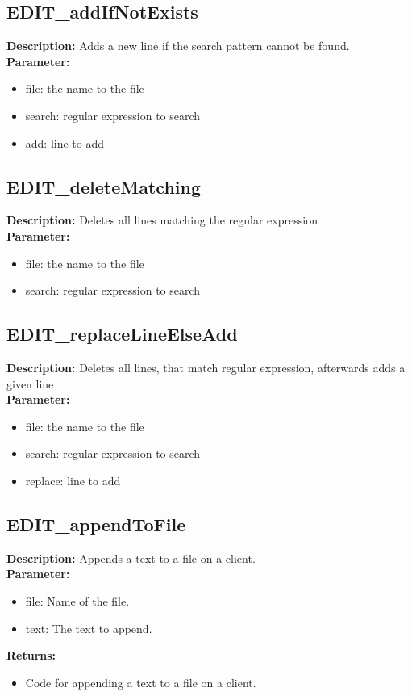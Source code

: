 \subsection{EDIT\_addIfNotExists}
\textbf{Description:} Adds a new line if the search pattern cannot be found.\\
\textbf{Parameter:}
\begin{itemize}
\item file: the name to the file
\item search: regular expression to search
\item add: line to add
\end{itemize}

\subsection{EDIT\_deleteMatching}
\textbf{Description:} Deletes all lines matching the regular expression\\
\textbf{Parameter:}
\begin{itemize}
\item file: the name to the file
\item search: regular expression to search
\end{itemize}

\subsection{EDIT\_replaceLineElseAdd}
\textbf{Description:} Deletes all lines, that match regular expression, afterwards adds a given line\\
\textbf{Parameter:}
\begin{itemize}
\item file: the name to the file
\item search: regular expression to search
\item replace: line to add
\end{itemize}

\subsection{EDIT\_appendToFile}
\textbf{Description:} Appends a text to a file on a client.\\
\textbf{Parameter:}
\begin{itemize}
\item file: Name of the file.
\item text: The text to append.
\end{itemize}
\textbf{Returns:}
\begin{itemize}
\item Code for appending a text to a file on a client.
\end{itemize}

